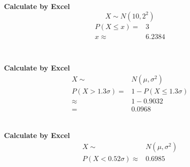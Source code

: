 \documentclass{article}
\begin{document}
    \section{}
        \paragraph{
            Calculate by Excel
            $$X\sim N(10,2^2)$$
            \begin{equation*}
                \begin{split}
                    P(X\leq x)=&3\\
                    x\approx &6.2384\\
                \end{split}
            \end{equation*}
        }
    \section{}
        \subsection{}
            \paragraph{
                Calculate by Excel
                \begin{equation*}
                    \begin{split}
                        X\sim &N(\mu,\sigma^2)\\
                        P(X>1.3\sigma)=&1-P(X\leq 1.3\sigma)\\
                            \approx&1-0.9032\\
                            =&0.0968\\
                    \end{split}                
                \end{equation*}
            }
        \subsection{}
            \paragraph{
                Calculate by Excel
                \begin{equation*}
                    \begin{split}
                        X\sim &N(\mu,\sigma^2)\\
                        P(X<0.52\sigma)\approx&0.6985
                    \end{split}
                \end{equation*}
            }
\end{document}

